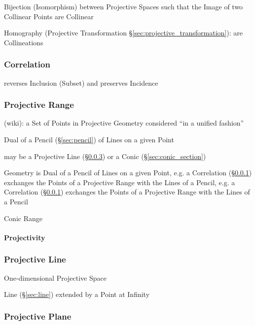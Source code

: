 Bijection (Isomorphism) between Projective Spaces such that the Image of two
Collinear Points are Collinear

\fist Homography (Projective Transformation
\S\ref{sec:projective_transformation}): are Collineations %



\subsubsection{Correlation}\label{sec:correlation}

reverses Inclusion (Subset) and preserves Incidence



\subsubsection{Projective Range}\label{sec:projective_range}

(wiki): a Set of Points in Projective Geometry considered ``in a unified
fashion''

Dual of a Pencil (\S\ref{sec:pencil}) of Lines on a given Point

may be a Projective Line (\S\ref{sec:projective_line}) or a Conic
(\S\ref{sec:conic_section})

Geometry is Dual of a Pencil of Lines on a given Point, e.g. a Correlation
(\S\ref{sec:correlation}) exchanges the Points of a Projective Range with the
Lines of a Pencil, e.g. a Correlation (\S\ref{sec:correlation}) exchanges the
Points of a Projective Range with the Lines of a Pencil

Conic Range



\paragraph{Projectivity}\label{sec:projectivity}\hfill



\subsubsection{Projective Line}\label{sec:projective_line}

One-dimensional Projective Space

Line (\S\ref{sec:line}) extended by a Point at Infinity



\subsubsection{Projective Plane}\label{sec:projective_plane}

